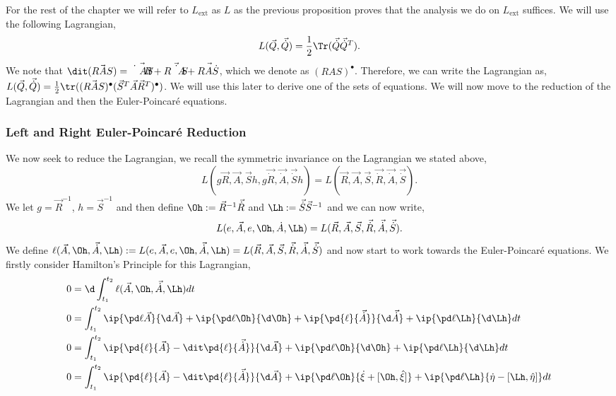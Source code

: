 \noindent
For the rest of the chapter we will refer to $L_\text{ext}$ as $L$ as the previous proposition proves that the analysis we do on $L_\text{ext}$ suffices. We will use the following Lagrangian,
$$ L(\vec Q, \vec{\dot Q}) = \frac{1}{2}\Tr(\vec{\dot Q}\vec{\dot Q}^T). $$
We note that $\dit (\vec{RAS}) = \vec{\dot RAS} + \vec{R\dot AS} + \vec{RA\dot S}$, which we denote as $(RAS)^{\bullet}$. Therefore, we can write the Lagrangian as, $L(\vec Q, \vec{\dot Q}) = \frac{1}{2}\tr((\vec{RAS})^\bullet (\vec S^T\vec A\vec R^T)^\bullet)$. We will use this later to derive one of the sets of equations. We will now move to the reduction of the Lagrangian and then the Euler-Poincar\'e equations.

\subsubsection{Left and Right Euler-Poincar\'e Reduction}
We now seek to reduce the Lagrangian, we recall the symmetric invariance on the Lagrangian we stated above,
$$ L(g\vec R, \vec A, \vec Sh, g\vec{\dot R}, \vec{\dot A}, \vec{\dot S}h) = L(\vec R, \vec A, \vec S, \vec{\dot R}, \vec{\dot A}, \vec{\dot S}). $$
We let $g = \vec R^{-1}$, $h = \vec S^{-1}$ and then define $\Oh := \vec R^{-1}\vec{\dot R}$ and $\Lh := \vec{\dot S}\vec S^{-1}$ and we can now write,
$$ L(e, \vec A, e, \Oh, \dot A, \Lh) = L(\vec R, \vec A, \vec S, \vec{\dot R}, \vec{\dot A}, \vec{\dot S}). $$
We define $\ell(\vec A, \Oh, \vec{\dot A}, \Lh) := L(e, \vec A, e, \Oh, \vec{\dot A}, \Lh) = L(\vec R, \vec A, \vec S, \vec{\dot R}, \vec{\dot A}, \vec{\dot S})$ and now start to work towards the Euler-Poincar\'e equations. We firstly consider Hamilton's Principle for this Lagrangian,
\begin{align*}
  0 &= \d \int_{t_1}^{t_2} \ell(\vec A, \Oh, \vec{\dot A}, \Lh)dt \\
  0 &= \int_{t_1}^{t_2} \ip{\pd \ell {\vec A}}{\d \vec A} + \ip{\pd \ell \Oh}{\d \Oh} + \ip{\pd{\ell}{\vec{\dot A}}}{\d \vec{\dot A}} + \ip{\pd \ell \Lh}{\d\Lh}dt \\
  0 &= \int_{t_1}^{t_2} \ip{\pd{\ell}{\vec A} - \dit\pd{\ell}{\vec{\dot A}}}{\d \vec A} + \ip{\pd \ell \Oh}{\d \Oh} + \ip{\pd \ell \Lh}{\d\Lh}dt \\
  0 &= \int_{t_1}^{t_2} \ip{\pd{\ell}{\vec A} - \dit\pd{\ell}{\vec{\dot A}}}{\d \vec A} + \ip{\pd \ell \Oh}{\dot \xi + [\Oh, \hat\xi]} + \ip{\pd \ell \Lh}{\dot \eta - [\Lh, \hat \eta]}dt \\
\end{align*}
